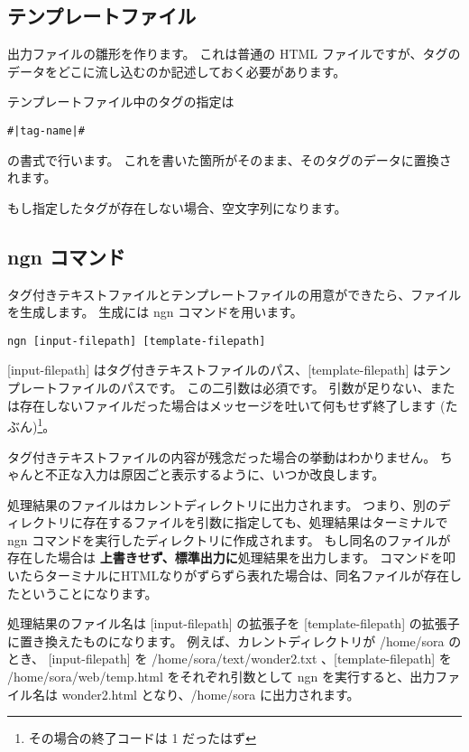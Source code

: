 \documentclass[a4j]{jsarticle}
\begin{document}




\subsection{テンプレートファイル}
出力ファイルの雛形を作ります。
これは普通の HTML ファイルですが、タグのデータをどこに流し込むのか記述しておく必要があります。

テンプレートファイル中のタグの指定は
\begin{lstlisting}[caption=タグ指定の書式]
#|tag-name|#
\end{lstlisting}
の書式で行います。
これを書いた箇所がそのまま、そのタグのデータに置換されます。

もし指定したタグが存在しない場合、空文字列になります。




\subsection{ngn コマンド}
タグ付きテキストファイルとテンプレートファイルの用意ができたら、ファイルを生成します。
生成には ngn コマンドを用います。

\begin{lstlisting}[caption=ngn コマンドの使い方]
  ngn [input-filepath] [template-filepath]
\end{lstlisting}

[input-filepath] はタグ付きテキストファイルのパス、[template-filepath] はテンプレートファイルのパスです。
この二引数は必須です。
引数が足りない、または存在しないファイルだった場合はメッセージを吐いて何もせず終了します (たぶん)\footnote{その場合の終了コードは 1 だったはず}。

タグ付きテキストファイルの内容が残念だった場合の挙動はわかりません。
ちゃんと不正な入力は原因ごと表示するように、いつか改良します。

処理結果のファイルはカレントディレクトリに出力されます。
つまり、別のディレクトリに存在するファイルを引数に指定しても、処理結果はターミナルで ngn コマンドを実行したディレクトリに作成されます。
もし同名のファイルが存在した場合は \textbf{上書きせず、標準出力に}処理結果を出力します。
コマンドを叩いたらターミナルにHTMLなりがずらずら表れた場合は、同名ファイルが存在したということになります。

処理結果のファイル名は [input-filepath] の拡張子を [template-filepath] の拡張子に置き換えたものになります。
例えば、カレントディレクトリが /home/sora のとき、 [input-filepath] を /home/sora/text/wonder2.txt 、[template-filepath] を /home/sora/web/temp.html をそれぞれ引数として ngn を実行すると、出力ファイル名は wonder2.html となり、/home/sora に出力されます。
\end{document}

